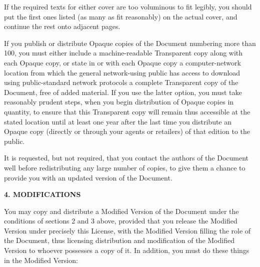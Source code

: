 If the required texts for either cover are too voluminous to fit
legibly, you should put the first ones listed (as many as fit
reasonably) on the actual cover, and continue the rest onto adjacent
pages.

If you publish or distribute Opaque copies of the Document numbering
more than 100, you must either include a machine-readable Transparent
copy along with each Opaque copy, or state in or with each Opaque copy
a computer-network location from which the general network-using
public has access to download using public-standard network protocols
a complete Transparent copy of the Document, free of added material.
If you use the latter option, you must take reasonably prudent steps,
when you begin distribution of Opaque copies in quantity, to ensure
that this Transparent copy will remain thus accessible at the stated
location until at least one year after the last time you distribute an
Opaque copy (directly or through your agents or retailers) of that
edition to the public.

It is requested, but not required, that you contact the authors of the
Document well before redistributing any large number of copies, to give
them a chance to provide you with an updated version of the Document.


\begin{center}
{\Large\bf 4. MODIFICATIONS\par}
{}
\end{center}

You may copy and distribute a Modified Version of the Document under
the conditions of sections 2 and 3 above, provided that you release
the Modified Version under precisely this License, with the Modified
Version filling the role of the Document, thus licensing distribution
and modification of the Modified Version to whoever possesses a copy
of it.  In addition, you must do these things in the Modified Version:


